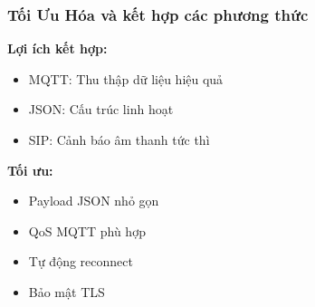 \begin{frame}
\frametitle{Tối Ưu Hóa và kết hợp các phương thức}

\textbf{Lợi ích kết hợp:}
\begin{itemize}
\item MQTT: Thu thập dữ liệu hiệu quả
\item JSON: Cấu trúc linh hoạt
\item SIP: Cảnh báo âm thanh tức thì
\end{itemize}

\textbf{Tối ưu:}
\begin{itemize}
\item Payload JSON nhỏ gọn
\item QoS MQTT phù hợp
\item Tự động reconnect
\item Bảo mật TLS
\end{itemize}

\end{frame}
